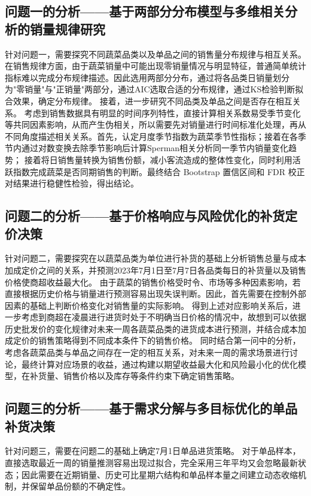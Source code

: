 \documentclass[withoutpreface,bwprint]{cumcmthesis} %
\numberwithin{equation}{section}
\begin{document}
\subsection{问题一的分析——基于两部分分布模型与多维相关分析的销量规律研究}
针对问题一，需要探究不同蔬菜品类以及单品之间的销售量分布规律与相互关系。
在销售规律方面，由于蔬菜销量中可能出现零销量情况与明显特征，普通简单统计指标难以完成分布规律描述。因此选用两部分分布，通过将各品类日销量划分为"零销量"与"正销量"两部分，通过AIC选取合适的分布规律，通过KS检验判断拟合效果，确定分布规律。
接着，进一步研究不同品类及单品之间是否存在相互关系。
考虑到销售数据具有明显的时间序列特性，直接计算相关系数易受季节变化等共同因素影响，从而产生伪相关，所以需要先对销量进行时间标准化处理，再从不同角度描述相关关系。首先，认定月度季节指数为蔬菜季节性指标；接着在各季节内通过对数变换去除季节影响后计算Sperman相关分析同一季节内销量变化趋势；
接着将日销售量转换为销售份额，减小客流造成的整体性变化，同时利用活跃指数完成蔬菜是否同期销售的判断。最终结合 Bootstrap 置信区间和 FDR 校正对结果进行稳健性检验，得出结论。

\subsection{问题二的分析——基于价格响应与风险优化的补货定价决策}

针对问题二，需要探究在以蔬菜品类为单位进行补货的基础上分析销售总量与成本加成定价之间的关系，并预测2023年7月1日至7月7日各品类每日的补货量以及销售价格使商超收益最大化。
由于蔬菜的销售价格受时令、市场等多种因素影响，若直接根据历史价格与销量进行预测容易出现失误判断。因此，首先需要在控制外部因素的基础上判断价格变化对销售量的实际影响。
得到上述对应影响关系后，进一步考虑到商超在凌晨进行进货时处于不明确当日价格的情况中，故想到可以依据历史批发价的变化规律对未来一周各蔬菜品类的进货成本进行预测，并结合成本加成定价的销售策略得到不同成本条件下的销售价格。
同时结合第一问中的分析，考虑各蔬菜品类与单品之间存在一定的相互关系，对未来一周的需求场景进行讨论，最终计算对应场景的收益，通过构建以期望收益最大化和风险最小化的优化模型，在补货量、销售价格以及库存等条件约束下确定销售策略。

\subsection{问题三的分析——基于需求分解与多目标优化的单品补货决策}

针对问题三，需要在问题二的基础上确定7月1日单品进货策略。
对于单品样本，直接选取最近一周的销量推测容易出现过拟合，完全采用三年平均又会忽略最新状态；因此需要在近期销量、历史可比星期六结构和单品样本量之间建立动态收缩机制，并保留单品份额的不确定性。
\end{document}
